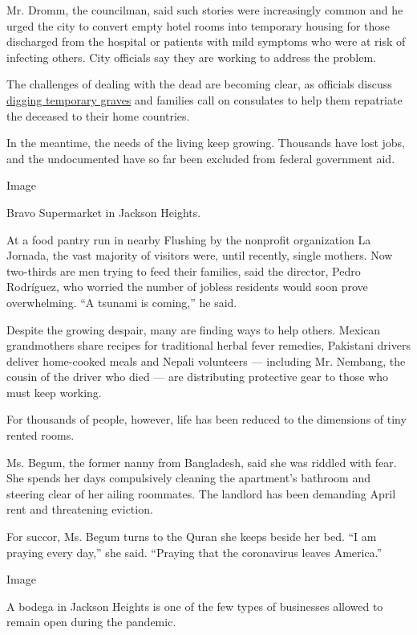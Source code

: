 Mr. Dromm, the councilman, said such stories were increasingly common
and he urged the city to convert empty hotel rooms into temporary
housing for those discharged from the hospital or patients with mild
symptoms who were at risk of infecting others. City officials say they
are working to address the problem.

The challenges of dealing with the dead are becoming clear, as officials
discuss
\href{https://www.nytimes3xbfgragh.onion/2020/04/06/nyregion/mass-graves-nyc-parks-coronavirus.html}{digging
temporary graves} and families call on consulates to help them
repatriate the deceased to their home countries.

In the meantime, the needs of the living keep growing. Thousands have
lost jobs, and the undocumented have so far been excluded from federal
government aid.

Image

Bravo Supermarket in Jackson Heights.~

At a food pantry run in nearby Flushing by the nonprofit organization La
Jornada, the vast majority of visitors were, until recently, single
mothers. Now two-thirds are men trying to feed their families, said the
director, Pedro Rodríguez, who worried the number of jobless residents
would soon prove overwhelming. ``A tsunami is coming,'' he said.

Despite the growing despair, many are finding ways to help others.
Mexican grandmothers share recipes for traditional herbal fever
remedies, Pakistani drivers deliver home-cooked meals and Nepali
volunteers --- including Mr. Nembang, the cousin of the driver who died
--- are distributing protective gear to those who must keep working.

For thousands of people, however, life has been reduced to the
dimensions of tiny rented rooms.

Ms. Begum, the former nanny from Bangladesh, said she was riddled with
fear. She spends her days compulsively cleaning the apartment's bathroom
and steering clear of her ailing roommates. The landlord has been
demanding April rent and threatening eviction.

For succor, Ms. Begum turns to the Quran she keeps beside her bed. ``I
am praying every day,'' she said. ``Praying that the coronavirus leaves
America.''

Image

A bodega in Jackson Heights is one of the few types of businesses
allowed to remain open during the pandemic.~

